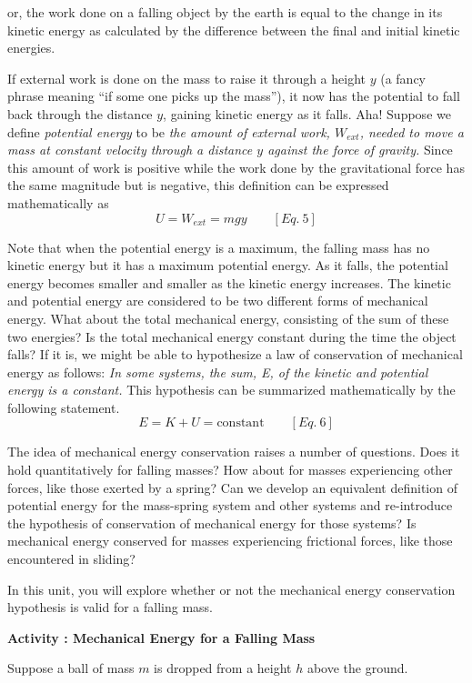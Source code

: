 or, the work done on a falling object by the earth is equal to the change in
its kinetic energy as calculated by the difference between the final and initial
kinetic energies.

If external work is done on the mass to raise it through a height $y$ (a fancy
phrase meaning ``if some one picks up the mass''), it now has
the potential to fall back through the distance $y$, gaining kinetic energy as
it falls. Aha! Suppose we define \textit{potential energy} to be \textit{the
amount of external work, \( W_{ext} \), needed to move a mass at constant velocity
through a distance $y$ against the force of gravity.} Since this amount of work
is positive while the work done by the gravitational force has the same magnitude
but is negative, this definition can be expressed mathematically as
\[
U=W_{ext}=mgy\qquad [Eq.\: 5]\]


Note that when the potential energy is a maximum, the falling mass has no kinetic
energy but it has a maximum potential energy. As it falls, the potential energy
becomes smaller and smaller as the kinetic energy increases. The kinetic and
potential energy are considered to be two different forms of mechanical energy.
What about the total mechanical energy, consisting of the sum of these two energies?
Is the total mechanical energy constant during the time the object falls? If
it is, we might be able to hypothesize a law of conservation of mechanical energy
as follows: \textit{In some systems, the sum, E, of the kinetic and potential
energy is a constant.} This hypothesis can be summarized mathematically by the
following statement.
\[
E=K+U=\mbox{constant}\qquad [Eq.\: 6]\]


The idea of mechanical energy conservation raises a number of questions. Does
it hold quantitatively for falling masses? How about for masses experiencing
other forces, like those exerted by a spring? Can we develop an equivalent definition
of potential energy for the mass-spring system and other systems and re-introduce
the hypothesis of conservation of mechanical energy for those systems? Is mechanical
energy conserved for masses experiencing frictional forces, like those encountered
in sliding?

In this unit, you will explore whether or not the mechanical energy conservation
hypothesis is valid for a falling mass.

\textbf{Activity : Mechanical Energy for a Falling Mass} 

Suppose a ball of mass $m$ is dropped from a height $h$ above the ground.

